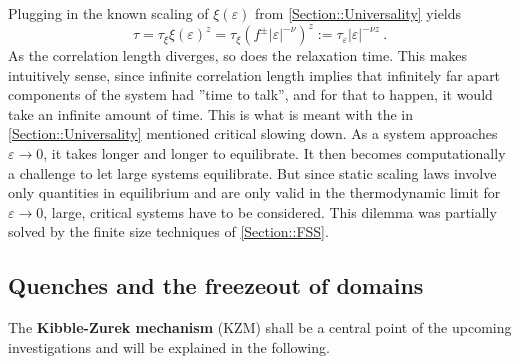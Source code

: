 	Plugging in the known scaling of $\xi(\varepsilon)$ from \autoref{Section::Universality} yields
	\begin{equation}
		\tau = \tau_\xi \xi(\varepsilon)^z =\tau_\xi	\left(f^{\pm} |\varepsilon|^{-\nu}\right)^z :=	\tau_\varepsilon |\varepsilon|^{-\nu z} ~.
	\end{equation}
	As the correlation length diverges, so does the relaxation time. This makes intuitively sense, since infinite correlation length implies that infinitely far apart components of the system had ''time to talk'', and for that to happen, it would take an infinite amount of time. This is what is meant with the in \autoref{Section::Universality} mentioned critical slowing down. As a system approaches $\varepsilon \rightarrow 0$, it takes longer and longer to equilibrate. It then becomes computationally a challenge to let large systems equilibrate. But since static scaling laws involve only quantities in equilibrium and are only valid in the thermodynamic limit for $\varepsilon \rightarrow 0$, large, critical systems have to be considered.  This dilemma was partially solved by the finite size techniques of \autoref{Section::FSS}.
	\subsection{Quenches and the freezeout of domains}
	The \textbf{Kibble-Zurek mechanism} (KZM) \cite{zurek1985cosmological, zurek1996cosmological} shall be a central point of the upcoming investigations and will be explained in the following. \\
	
